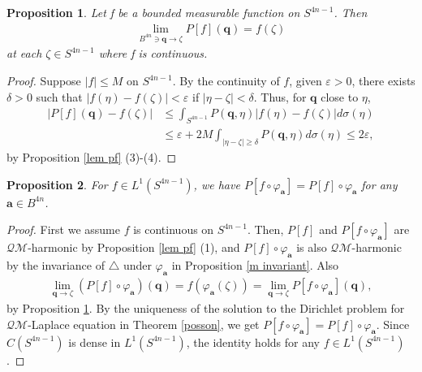 \documentclass[a4paper,11pt]{amsart}
\numberwithin{equation}{section}
\newtheorem{prop}{Proposition}[section]
\begin{document}
\begin{prop}\label{lim pf}
Let f be a bounded measurable function on $S^{4n-1}$. Then
\begin{equation*}\begin{aligned}
\lim_{B^{4n}\ni\mathbf{q}\rightarrow\zeta}P[f](\mathbf{q})=f(\zeta)
\end{aligned}\end{equation*}
at each $\zeta\in S^{4n-1}$ where f is continuous.

\end{prop}
\begin{proof}
Suppose $|f|\leq M$ on $S^{4n-1}$. By the continuity of $f$, given $\varepsilon>0$, there exists $\delta>0$ such that $|f(\eta)-f(\zeta)|<\varepsilon$ if $|\eta-\zeta|<\delta$.
Thus, for $\mathbf{q}$ close to $\eta$,
\begin{equation*}\begin{aligned}
|P[f](\mathbf{q})-f(\zeta)|&\leq\int_{S^{4n-1}}P(\mathbf{q},\eta)|f(\eta)-f(\zeta)|d\sigma(\eta)\\
&\leq\varepsilon+2M\int_{|\eta-\zeta|\geq\delta}P(\mathbf{q},\eta)d\sigma(\eta)\leq 2\varepsilon,
\end{aligned}\end{equation*}
by Proposition \ref{lem pf} (3)-(4).
\end{proof}


\begin{prop}
For $f\in L^1(S^{4n-1})$, we have $P[f\circ \varphi_{\mathbf{a}}]=P[f]\circ \varphi_{\mathbf{a}}$ for any $\mathbf{a}\in B^{4n}$.
\end{prop}
\begin{proof}
First we assume $f$ is continuous on $S^{4n-1}$. Then, $P[f]$ and $P[f\circ \varphi_{\mathbf{a}}]$ are $\mathcal{QM}$-harmonic by Proposition \ref{lem pf} (1), and $P[f]\circ \varphi_{\mathbf{a}}$ is also $\mathcal{QM}$-harmonic by the invariance of $\triangle$ under $\varphi_{\mathbf{a}}$ in Proposition \ref{m invariant}. Also
\begin{equation}\begin{aligned}
\lim_{\mathbf{q}\rightarrow\zeta}(P[f]\circ \varphi_{\mathbf{a}})(\mathbf{q})=f(\varphi_{\mathbf{a}}(\zeta))=\lim_{\mathbf{q}\rightarrow\zeta}P[f\circ \varphi_{\mathbf{a}}](\mathbf{q}),
\end{aligned}\end{equation}
by Proposition \ref{lim pf}. By the uniqueness of the solution to the Dirichlet problem for $\mathcal{QM}$-Laplace equation in Theorem \ref{posson}, we get $P[f\circ \varphi_{\mathbf{a}}]=P[f]\circ \varphi_{\mathbf{a}}$.
Since $C(S^{4n-1})$ is dense in $L^1(S^{4n-1})$, the identity holds for any $f\in L^1(S^{4n-1})$.
\end{proof}
\end{document}
